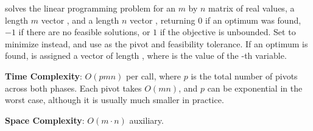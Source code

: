 \begin{compactitem}
  \item {} solves the linear programming problem for an $m$ by $n$ matrix  of real values, a length $m$ vector , and a length $n$ vector , returning $0$ if an optimum was found, $-1$ if there are no feasible solutions, or $1$ if the objective is unbounded. Set  to minimize instead, and use  as the pivot and feasibility tolerance. If an optimum is found,  is assigned a vector of length , where  is the value of the -th variable.
\end{compactitem}

\textbf{Time Complexity}: $O(pmn)$ per call, where $p$ is the total number of pivots across both phases. Each pivot takes $O(mn)$, and $p$ can be exponential in the worst case, although it is usually much smaller in practice.

\textbf{Space Complexity}: $O(m \cdot n)$ auxiliary.

